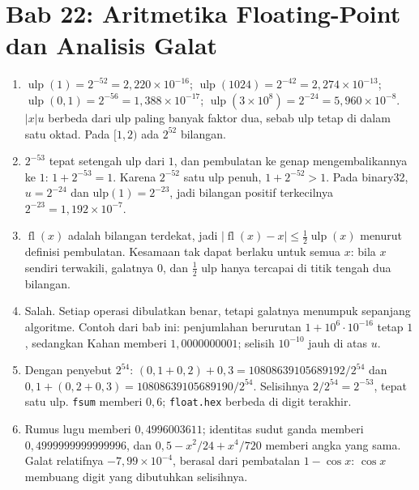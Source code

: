 \section*{Bab 22: Aritmetika Floating-Point dan Analisis Galat}
\begin{enumerate}[label=\textbf{22.\arabic*}]
  \item $\operatorname{ulp}(1)=2^{-52}=2{,}220\times10^{-16}$;
        $\operatorname{ulp}(1024)=2^{-42}=2{,}274\times10^{-13}$;
        $\operatorname{ulp}(0{,}1)=2^{-56}=1{,}388\times10^{-17}$;
        $\operatorname{ulp}(3\times10^{8})=2^{-24}=5{,}960\times10^{-8}$.
        $|x|u$ berbeda dari ulp paling banyak faktor dua, sebab ulp tetap di dalam satu
        oktad. Pada $[1,2)$ ada $2^{52}$ bilangan.

  \item $2^{-53}$ tepat setengah ulp dari $1$, dan pembulatan ke genap
        mengembalikannya ke $1$: $1+2^{-53}=1$. Karena $2^{-52}$ satu ulp penuh,
        $1+2^{-52}>1$. Pada binary32, $u=2^{-24}$ dan ulp$(1)=2^{-23}$, jadi bilangan
        positif terkecilnya $2^{-23}=1{,}192\times10^{-7}$.

  \item $\operatorname{fl}(x)$ adalah bilangan terdekat, jadi
        $|\operatorname{fl}(x)-x|\le\tfrac12\operatorname{ulp}(x)$ menurut definisi
        pembulatan. Kesamaan tak dapat berlaku untuk semua $x$: bila $x$ sendiri
        terwakili, galatnya $0$, dan $\tfrac12$ ulp hanya tercapai di titik tengah
        dua bilangan.

  \item Salah. Setiap operasi dibulatkan benar, tetapi galatnya menumpuk sepanjang
        algoritme. Contoh dari bab ini: penjumlahan berurutan $1+10^{6}\cdot10^{-16}$
        tetap $1$, sedangkan Kahan memberi $1{,}0000000001$; selisih $10^{-10}$
        jauh di atas $u$.

  \item Dengan penyebut $2^{54}$: $(0{,}1+0{,}2)+0{,}3=10808639105689192/2^{54}$ dan
        $0{,}1+(0{,}2+0{,}3)=10808639105689190/2^{54}$. Selisihnya $2/2^{54}=2^{-53}$,
        tepat satu ulp. \texttt{fsum} memberi $0{,}6$; \texttt{float.hex} berbeda di
        digit terakhir.

  \item Rumus lugu memberi $0{,}4996003611$; identitas sudut ganda memberi
        $0{,}4999999999999996$, dan $0{,}5-x^{2}/24+x^{4}/720$ memberi angka yang sama.
        Galat relatifnya $-7{,}99\times10^{-4}$, berasal dari pembatalan $1-\cos x$:
        $\cos x$ membuang digit yang dibutuhkan selisihnya.


\end{enumerate}
